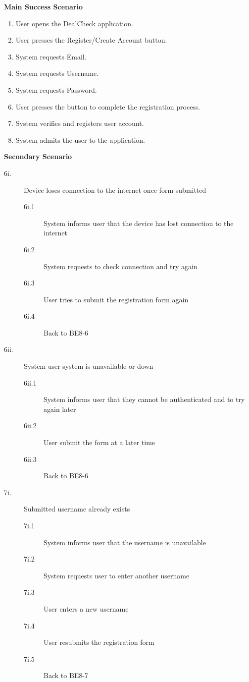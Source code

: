 \documentclass[]{article}
\begin{document}
\begin{enumerate}
\begin{enumerate}[{\bf {BE}1.}]
{\bf Main Success Scenario}
    \begin{enumerate}[1.]
        \item User opens the DealCheck application.
        \item User presses the Register/Create Account button.
        \item System requests Email.
        \item System requests Username.
        \item System requests Password.
        \item User presses the button to complete the registration process.
        \item System verifies and registers user account.
        \item System admits the user to the application.
    \end{enumerate}
    
    {\bf Secondary Scenario} \\
    \begin{description}
		\item [6i.] Device loses connection to the internet once form submitted
		\begin{description}
			\item [6i.1] System informs user that the device has lost connection to the internet
			\item [6i.2] System requests to check connection and try again
			\item [6i.3] User tries to submit the registration form again
			\item [6i.4] Back to BE8-6
		\end{description}

		\item [6ii.] System user system is unavailable or down
		\begin{description}
			\item [6ii.1] System informs user that they cannot be authenticated and to try again later
			\item [6ii.2] User submit the form at a later time
			\item [6ii.3] Back to BE8-6
		\end{description}

		\item [7i.] Submitted username already exists
		\begin{description}
			\item [7i.1] System informs user that the username is unavailable
			\item [7i.2] System requests user to enter another username
			\item [7i.3] User enters a new username
			\item [7i.4] User resubmits the registration form
			\item [7i.5] Back to BE8-7
		\end{description}


\end{description}
\end{enumerate}
\end{enumerate}
\end{document}
